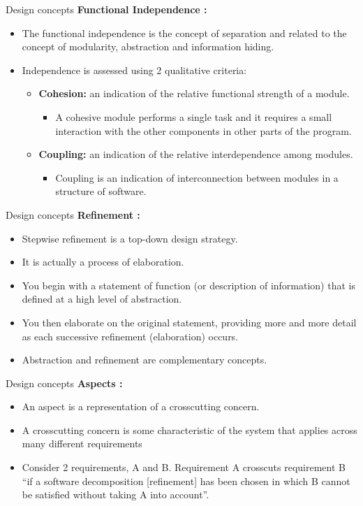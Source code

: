 \documentclass{beamer}
\begin{document}
\begin{frame}{Design concepts}
	\textbf{Functional Independence :}
	\begin{itemize}
		\item The functional independence is the concept of separation and related to the concept of modularity, abstraction and information hiding.
		\item Independence is assessed using 2 qualitative criteria:
		\begin{itemize}
			\item \textbf{Cohesion:}  an indication of the relative functional strength of a module.
			\begin{itemize}
				\item A cohesive module performs a single task and it requires a small interaction with the other components in other parts of the program.
			\end{itemize}
			\item \textbf{Coupling:} an indication of the relative interdependence among modules.
			\begin{itemize}
				\item Coupling is an indication of interconnection between modules in a structure of software.
			\end{itemize}
		\end{itemize}
	\end{itemize}
\end{frame}
\begin{frame}{Design concepts}
	\textbf{Refinement :}
	\begin{itemize}
		\item Stepwise refinement is a top-down design strategy.
		\item It is actually a process of elaboration.
		\item You begin with a statement of function (or description of information) that
		is defined at a high level of abstraction.
		\item You then elaborate on the original statement, providing more and more  detail as each successive refinement (elaboration) occurs.
		\item Abstraction and refinement are complementary concepts. 
		
		\end{itemize}
\end{frame}
\begin{frame}{Design concepts}
	\textbf{Aspects :}
	\begin{itemize}
		\item An aspect is a representation of a crosscutting concern. 
		\item A crosscutting concern is 
		some characteristic of the system that applies across many different requirements
		\item Consider 2 requirements, A and B. Requirement A crosscuts requirement B  “if a software decomposition [refinement] has been chosen in which B  cannot be satisfied without taking A into account”.
		
	\end{itemize}
\end{frame}
\end{document}
